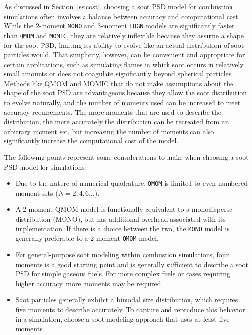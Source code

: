 \documentclass[preprint,letterpaper]{elsarticle}
\begin{document}
As discussed in Section~\ref{ss:cost}, choosing a soot PSD model for combustion simulations often involves a balance between accuracy and computational cost. While the 2-moment \texttt{MONO} and 3-moment \texttt{LOGN} models are significantly faster than \texttt{QMOM} and \texttt{MOMIC}, they are relatively inflexible because they assume a shape for the soot PSD, limiting its ability to evolve like an actual distribution of soot particles would. That simplicity, however, can be convenient and appropriate for certain applications, such as simulating flames in which soot occurs in relatively small amounts or does not coagulate significantly beyond spherical particles. Methods like QMOM and MOMIC that do not make assumptions about the shape of the soot PSD are advantageous because they allow the soot distribution to evolve naturally, and the number of moments used can be increased to meet accuracy requirements. The more moments that are used to describe the distribution, the more accurately the distribution can be recreated from an arbitrary moment set, but increasing the number of moments can also significantly increase the computational cost of the model.

The following points represent some considerations to make when choosing a soot PSD model for simulations:
\begin{itemize}
    \item Due to the nature of numerical quadrature, \texttt{QMOM} is limited to even-numbered moment sets ($N=2,4,6\ldots$).
    \item A 2-moment QMOM model is functionally equivalent to a monodisperse distribution (MONO), but has additional overhead associated with its implementation. If there is a choice between the two, the \texttt{MONO} model is generally preferable to a 2-moment \texttt{QMOM} model.
    \item For general-purpose soot modeling within combustion simulations, four moments is a good starting point and is generally sufficient to describe a soot PSD for simple gaseous fuels. For more complex fuels or cases requiring higher accuracy, more moments may be required.
    \item Soot particles generally exhibit a bimodal size distribution, which requires five moments to describe accurately. To capture and reproduce this behavior in a simulation, choose a soot modeling approach that uses at least five moments.
\end{itemize}
\end{document}
